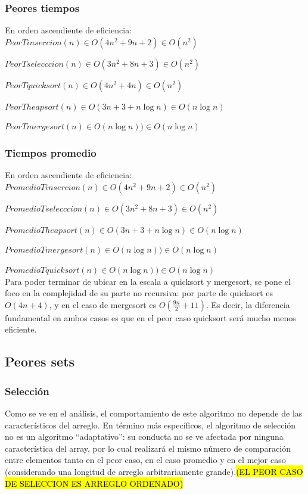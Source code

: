 \documentclass[article,a4paper]{article}
\begin{document}
\subsubsection{Peores tiempos}

En orden ascendiente de eficiencia:\\

$PeorTinsercion(n) \in O(4n^2 + 9n + 2) \in O(n^2)$

$PeorTselecccion(n) \in O(3n^2 + 8n + 3) \in O(n^2)$ 

$PeorTquicksort(n) \in O(4n^2 + 4n) \in O(n^2)$

$PeorTheapsort(n)  \in O(3n + 3 +n \log n) \in O(n \log n)$

$PeorTmergesort(n) \in O(n \log n)) \in O(n \log n)$

\subsubsection{Tiempos promedio}

En orden ascendiente de eficiencia:\\

$PromedioTinsercion(n) \in O(4n^2 + 9n + 2) \in O(n^2)$

$PromedioTselecccion(n)  \in O(3n^2 + 8n + 3) \in O(n^2)$

$PromedioTheapsort(n) \in O(3n + 3 +n \log n) \in O(n \log n)$ 

$PromedioTmergesort(n) \in O(n \log n)) \in O(n \log n)$

$PromedioTquicksort(n) \in O(n \log n)) \in O(n \log n)$\\

Para poder terminar de ubicar en la escala a quicksort y mergesort, se pone el foco en la complejidad de su parte no recursiva: por parte de quicksort es $O(4n + 4)$, y en el caso de mergesort es $O( \frac{9n}{2} +11 )$. Es decir, la diferencia fundamental en ambos casos es que en el peor caso quicksort será mucho menos eficiente.

\subsection{Peores sets}

\subsubsection{Selección}

Como se ve en el análisis, el comportamiento de este algoritmo no depende de las característicos del arreglo. En término más específicos, el algoritmo de selección no es un algoritmo “adaptativo”: su conducta no se ve afectada por ninguna característica del array, por lo cual realizará el mismo número de comparación entre elementos tanto en el peor caso, en el caso promedio y en el mejor caso (considerando una longitud de arreglo arbitrariamente grande).\hl{(EL PEOR CASO DE SELECCION ES ARREGLO ORDENADO)}
\end{document}
